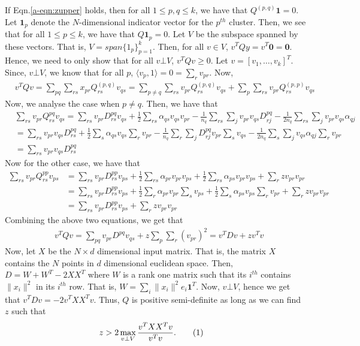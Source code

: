 \documentclass[12pt]{article}
\newcommand{\mb}{\mathbf}
\newcommand\numberthis{\addtocounter{equation}{1}\tag{\theequation}}
\begin{document}
If Eqn.\ref{a-eqn:zupper} holds, then for all $1 \le p, q \le k$, we have that $Q^{(p,q)}\mb1 = 0$. Let $\mb 1_p$ denote the $N$-dimensional indicator vector for the $p^{th}$ cluster. Then, we see that for all $1 \le p \le k$, we have that $Q \mb 1_p = 0$. Let $V$ be the subspace spanned by these vectors. That is, $V = span\{1_p\}_{p=1}^k$. Then, for all $v \in V$, $v^T Q y = v^T \mb 0 = \mb 0$. Hence, we need to only show that for all $v \bot V$, $v^TQv \ge 0$. Let $v = [v_1, \ldots, v_k]^T$. Since, $v \bot V$, we know that for all $p$, $\langle v_p, 1\rangle = 0 = \sum_{r}v_{pr}$. Now,
\begin{align*}
  &v^TQv = \sum_{pq}\sum_{rs}x_{pr}Q^{(p, q)}_{rs}v_{qs} = \sum_{p \neq q}\sum_{rs}v_{pr}Q^{(p, q)}_{rs}v_{qs} + \sum_{p}\sum_{rs}v_{pr}Q^{(p, p)}_{rs}v_{qs}
\end{align*}
Now, we analyse the case when $p \neq q$. Then, we have that
\begin{align*}
  &\sum_{rs}v_{pr}Q^{pq}_{rs}v_{qs} = \sum_{rs}v_{pr}D^{pq}_{rs}v_{qs} + \frac{1}{2}\sum_{rs}\alpha_{qs}v_{qs}v_{pr} -\frac{1}{n_q}\sum_{rs} \sum_j v_{pr}v_{qs}D^{pq}_{rj} -\frac{1}{2n_q}\sum_{rs}\sum_jv_{pr}v_{qs}\alpha_{qj}\\
  &= \sum_{rs}v_{pr}v_{qs}D^{pq}_{rs} + \frac{1}{2}\sum_{s}\alpha_{qs}v_{qs}\sum_r v_{pr} -\frac{1}{n_q}\sum_{r}\sum_j D^{pq}_{rj}v_{pr}\sum_sv_{qs} -\frac{1}{2n_q}\sum_{s}\sum_jv_{qs}\alpha_{qj}\sum_{r}v_{pr}\\
  &= \sum_{rs}v_{pr}v_{qs}D^{pq}_{rs}
\end{align*}
Now for the other case, we have that
\begin{align*}
  \sum_{rs}v_{pr}Q^{pp}_{rs}v_{ps} &= \sum_{rs}v_{pr}D^{pp}_{rs}v_{ps} + \frac{1}{2}\sum_{rs}\alpha_{pr}v_{pr}v_{ps} + \frac{1}{2}\sum_{rs}\alpha_{ps}v_{pr}v_{ps} + \sum_r zv_{pr}v_{pr}\\
  &= \sum_{rs}v_{pr}D^{pp}_{rs}v_{ps} + \frac{1}{2}\sum_{r}\alpha_{pr}v_{pr}\sum_sv_{ps} + \frac{1}{2}\sum_{s}\alpha_{ps}v_{ps}\sum_r v_{pr} + \sum_r zv_{pr}v_{pr}\\
  &=\sum_{rs}v_{pr}D^{pp}_{rs}v_{ps} + \sum_r zv_{pr}v_{pr}
\end{align*}
Combining the above two equations, we get that 
\begin{align*}
  &v^TQv = \sum_{pq}v_{pr}D^{pq}v_{qs} + z\sum_p\sum_{r} (v_{pr})^2 = v^TDv + zv^Tv
\end{align*}
Now, let $X$ be the $N \times d$ dimensional input matrix. That is, the matrix $X$ contains the $N$ points in $d$ dimensional euclidean space. Then, $D = W + W^T - 2 XX^T$ where $W$ is a rank one matrix such that its $i^{th}$ contains $\|x_i\|^2$ in its $i^{th}$ row. That is, $W = \sum_i \|x_i\|^2 e_i\mb 1^T$. Now, $v \bot V$, hence we get that $v^TDv = -2v^TXX^Tv$. Thus, $Q$ is positive semi-definite as long as we can find $z$ such that  
\begin{align*}
  &z > 2 \max_{v\bot V} \frac{v^T XX^Tv}{v^Tv}. \label{a-eqn:zlower}\numberthis
\end{align*}
\end{document}
